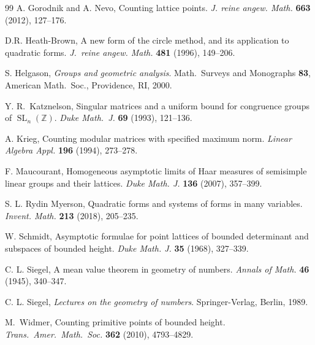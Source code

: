 \documentclass[11pt,reqno]{amsart}
\theoremstyle{definition}
\theoremstyle{remark}
\numberwithin{equation}{section}
\numberwithin{thm}{section}
\numberwithin{table}{section}
\begin{document}
\begin{thebibliography}{99}
A. Gorodnik and  A. Nevo, Counting lattice points. {\it J. reine angew. Math.} {\bf 663}
(2012), 127--176.

D.R. Heath-Brown, 
A new form of the circle method, and its application to quadratic forms. 
{\it J.\ reine angew. Math.} {\bf 481} (1996), 149--206.


S. Helgason, {\it Groups and geometric analysis}.
Math.\  Surveys and Monographs {\bf 83},
American Math.\ Soc., Providence, RI, 2000.


Y. R.~Katznelson,
Singular matrices and a uniform bound for congruence groups of
$\operatorname{SL}_n(\mathbb{Z})$.
{\it Duke Math.\ J.} \textbf{69} (1993), 121--136.



A. Krieg, Counting modular matrices with specified maximum norm. {\it Linear Algebra Appl.} {\bf 196} (1994), 273--278.

F. Maucourant, Homogeneous asymptotic limits of {Haar} measures of semisimple linear groups and their lattices. {\it Duke Math. J.} {\bf 136} (2007), 357--399.

S. L. Rydin Myerson,
Quadratic forms and systems of forms in many variables.
{\it Invent. Math.} {\bf 213} (2018), 205--235.


 W. Schmidt, Asymptotic formulae for point lattices of bounded determinant and subspaces of
bounded height.
{\it Duke Math. J.} {\bf  35} (1968), 327--339.


C. L. Siegel, A mean value theorem in geometry of numbers.
{\it Annals of Math.} {\bf 46} (1945), 340--347.


C. L. Siegel, {\it Lectures on the geometry of numbers}.
Springer-Verlag, Berlin, 1989.


M.~Widmer,
Counting primitive points of bounded height.
{\it Trans.\ Amer.\ Math.\ Soc.} \textbf{362} (2010), 4793--4829.


\end{thebibliography}
\end{document}
